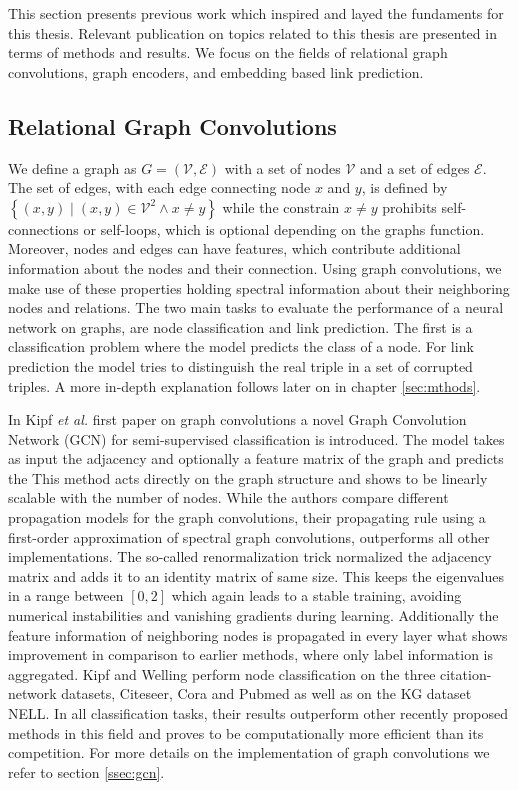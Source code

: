 This section presents previous work which inspired and layed the fundaments for this thesis. Relevant publication on topics related to this thesis are presented in terms of methods and results. We focus on the fields of relational graph convolutions, graph encoders, and embedding based link prediction.

\subsection{Relational Graph Convolutions}
We define a graph as $G=(\mathcal{V}, \mathcal{E})$  with a set of nodes $\mathcal{V}$ and a set of edges $\mathcal{E}$. The set of edges, with each edge connecting node $x$ and $y$, is defined by $\left\{(x, y) \mid(x, y) \in \mathcal{V}^{2} \wedge x \neq y\right\}$ while the constrain $x \neq y$ prohibits self-connections or self-loops, which is optional depending on the graphs function. Moreover, nodes and edges can have features, which contribute additional information about the nodes and their connection. Using graph convolutions, we make use of these properties holding spectral information about their neighboring nodes and relations. The two main tasks to evaluate the performance of a neural network on graphs, are node classification and link prediction. The first is a classification problem where the model predicts the class of a node. For link prediction the model tries to distinguish the real triple in a set of corrupted triples. A more in-depth explanation follows later on in chapter \ref{sec:mthods}.

In Kipf \textit{et al.} first paper on graph convolutions \cite{kipf_semi-supervised_2017} a novel Graph Convolution Network (GCN) for semi-supervised classification is introduced. The model takes as input the adjacency and optionally a feature matrix of the graph and predicts the  This method acts directly on the graph structure and shows to be linearly scalable with the number of nodes. While the authors compare different propagation models for the graph convolutions, their propagating rule using a first-order approximation of spectral graph convolutions, outperforms all other implementations. The so-called renormalization trick normalized the adjacency matrix and adds it to an identity matrix of same size. This keeps the eigenvalues in a range between $[0,2]$ which again leads to a stable training, avoiding numerical instabilities and vanishing gradients during learning. Additionally the feature information of neighboring nodes is propagated in every layer what shows improvement in comparison to earlier methods, where only label information is aggregated.
Kipf and Welling perform node classification on the three citation-network datasets, Citeseer, Cora and Pubmed as well as on the KG dataset NELL. In all classification tasks, their results outperform other recently proposed methods in this field and proves to be computationally more efficient than its competition. For more details on the implementation of graph convolutions we refer to section \ref{ssec:gcn}. 


